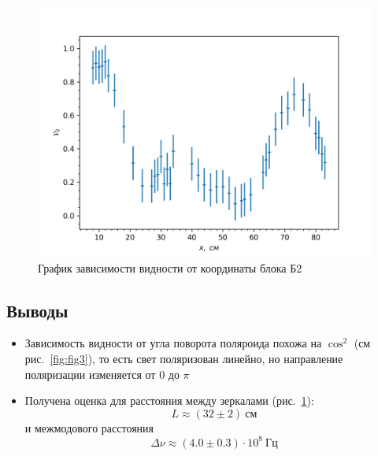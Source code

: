 \documentclass[12pt]{article}
\begin{document}
    \begin{figure}[b]
        \centering
        \includegraphics[width=0.9\linewidth]{pic/V(x)}
        \caption{График зависимости видности от координаты блока Б2}
        \label{fig:fig4}
    \end{figure}


    \subsection*{Выводы}
    \begin{itemize}
        \item Зависимость видности от угла поворота поляроида похожа на $\cos^2$ (см рис.\ \ref{fig:fig3}),
        то есть свет поляризован линейно, но направление поляризации изменяется от $0$ до $\pi$
        \item Получена оценка для расстояния между зеркалами (рис.\ \ref{fig:fig4}):
        \[L \approx (32 \pm 2)\ \text{см}\]
        и межмодового расстояния
        \[\Delta \nu \approx (4.0\pm0.3)\cdot10^8\ \text{Гц}\]
    \end{itemize}
\end{document}
